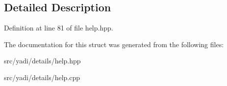 \subsection{Detailed Description}


Definition at line 81 of file help.\+hpp.



The documentation for this struct was generated from the following files\+:\begin{DoxyCompactItemize}
\item 
src/yadi/details/help.\+hpp\item 
src/yadi/details/help.\+cpp\end{DoxyCompactItemize}
